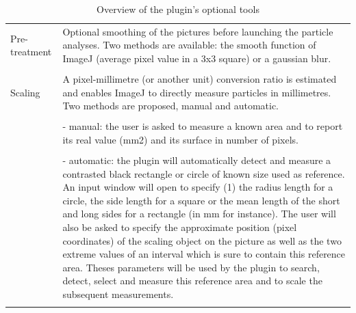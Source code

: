 \begin{longtable}{
	p{}%
 	p{}}
 	
 	\caption{Overview of the plugin's optional tools}\label{Tab21-1}\\
 	\hline
 	\endhead
 	
\hline
\endfoot

Pre-treatment 	& Optional smoothing of the pictures before launching the
particle analyses. Two methods are available: the smooth function of ImageJ (average
pixel value in a 3x3 square) or a gaussian blur.\\
\hspace{1cm} &\\
Scaling 		& A pixel-millimetre (or another unit) conversion ratio is estimated
and enables ImageJ to directly measure particles in millimetres. Two methods are
proposed, manual and automatic.\\
\hspace{1cm} &\\
				&- manual: the user is asked to measure a known area and to report its real
value (mm2) and its surface in number of pixels.\\
\hspace{1cm} &\\
				&- automatic: the plugin will automatically detect and measure a contrasted
black rectangle or circle of known size used as reference. An input window will
open to specify (1) the radius length for a circle, the side length for a square
or the mean length of the short and long sides for a rectangle (in mm for
instance). The user will also be asked to specify the approximate position
(pixel coordinates) of the scaling object on the picture as well as the two
extreme values of an interval which is sure to contain this reference area.
Theses parameters will be used by the plugin to search, detect, select and
measure this reference area and to scale the subsequent measurements.\\
\hspace{1cm} &\\

\end{longtable}
